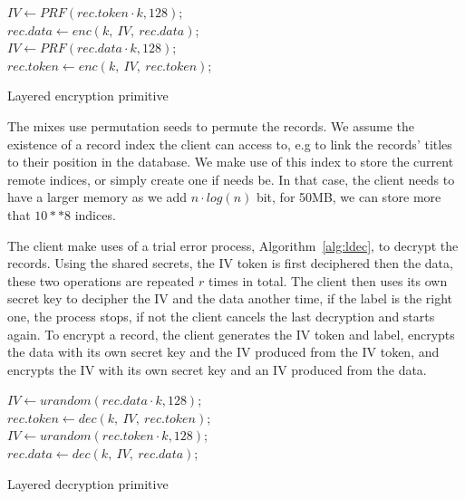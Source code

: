 \documentclass[USenglish,oneside,twocolumn]{article}
\begin{document}
\begin{algorithm}
\DontPrintSemicolon
{}
$IV \gets PRF(rec.token\cdot k, 128)$;\\
$rec.data \gets enc\left(k,\ IV,\ rec.data \right )$;\\
$IV \gets PRF(rec.data \cdot k, 128)$;\\
$rec.token \gets enc\left(k,\ IV,\ rec.token \right )$;\\
\caption{Layered encryption primitive}
\label{alg:lencp}
\end{algorithm}


\noindent The mixes use permutation seeds to permute the records. We assume the existence of a record index the client can access to, e.g to link the records' titles to their position in the database. We make use of this index to store the current remote indices, or simply create one if needs be. In that case, the client needs to have a larger memory  as we add $n\cdot log(n)$ bit, for 50MB, we can store more that $10**8$ indices.

The client make uses of a trial error process, Algorithm~\ref{alg:ldec}, to decrypt the records. Using the shared secrets, the IV token is first deciphered then the data, these two operations are repeated $r$ times in total. The client then uses its own secret key to decipher the IV and the data another time, if the label is the right one, the process stops, if not the client cancels the last decryption and starts again.
To encrypt a record, the client generates the IV token and label, encrypts the data with its own secret key and the IV produced from the IV token, and encrypts the IV with its own secret key and an IV produced from the data.
 
\begin{algorithm}
\DontPrintSemicolon
{}
$IV \gets urandom(rec.data \cdot k, 128)$;\\
$rec.token \gets dec\left(k,\ IV,\ rec.token \right )$;\\
$IV \gets urandom(rec.token\cdot k, 128)$;\\
$rec.data \gets dec\left(k,\ IV,\ rec.data \right )$;\\
\caption{Layered decryption primitive}
\label{alg:ldecp}
\end{algorithm}
\end{document}
